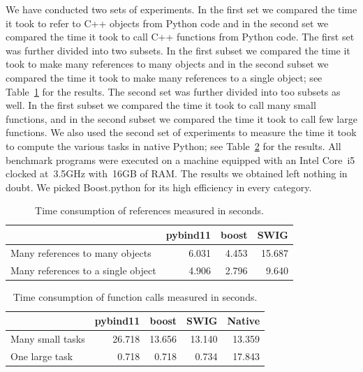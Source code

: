 We have conducted two sets of experiments. In the first set we
compared the time it took to refer to C++ objects from Python code and
in the second set we compared the time it took to call C++ functions
from Python code. The first set was further divided into two
subsets. In the first subset we compared the time it took to make many
references to many objects and in the second subset we compared the
time it took to make many references to a single object; see
Table~\ref{tab:res:refs} for the results.
%
The second set was further divided into too subsets as well. In the 
first subset we compared the time it took to call many small functions, 
and in the second subset we compared the time it took to call few large 
functions. We also used the second set of experiments to measure the time 
it took to compute the various tasks in native Python; see 
Table~\ref{tab:res:calls} for the results. 
%
All benchmark programs were executed on a machine equipped with an 
Intel Core~i5 clocked at~3.5GHz with~16GB of RAM.
%
The results we obtained left nothing in doubt.
We picked Boost.python for its high efficiency in every category.

\begin{table}
  \caption{Time consumption of references measured in seconds.}
  \label{tab:res:refs}
  \centering\begin{tabular}{|l|r|r|r|}
    \hline
    & \textbf{pybind11} & \textbf{boost} & \textbf{SWIG}\\
    \hline
    \hline
    Many references to many objects    & 6.031  & 4.453 & 15.687\\
    \hline
    Many references to a single object & 4.906  & 2.796 &  9.640\\
    \hline
  \end{tabular}
\end{table}
\begin{table}
  \caption{Time consumption of function calls measured in seconds.}
  \label{tab:res:calls}
  \centering\begin{tabular}{|l|r|r|r|r|}
    \hline
    & \textbf{pybind11} & \textbf{boost} & \textbf{SWIG} & \textbf{Native}\\
    \hline
    \hline
    Many small tasks & 26.718 & 13.656 & 13.140 & 13.359\\
    \hline
    One large task   & 0.718  & 0.718  & 0.734  & 17.843\\
    \hline
  \end{tabular}
\end{table}

